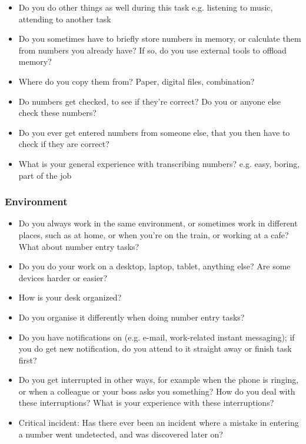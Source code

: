 \documentclass[11pt,oneside]{report}
\begin{document}
\begin{table}
\begin{itemize}
\item Do you do other things as well during this task
e.g. listening to music, attending to another task
\item Do you sometimes have to briefly store numbers in memory, or calculate them from numbers you already have?
If so, do you use external tools to offload memory?
\item Where do you copy them from? Paper, digital files, combination?
\item Do numbers get checked, to see if they're correct? Do you or anyone else check these numbers?
\item Do you ever get entered numbers from someone else, that you then have to check if they are correct?
\item What is your general experience with transcribing numbers?
e.g. easy, boring, part of the job
\end{itemize}
\subsubsection{Environment}
\begin{itemize}
\item Do you always work in the same environment, or sometimes work in different places, such as at home, or when you're on the train, or working at a cafe? What about number entry tasks?
\item Do you do your work on a desktop, laptop, tablet, anything else? Are some devices harder or easier?
\item How is your desk organized?
\item Do you organise it differently when doing number entry tasks?
\item Do you have notifications on (e.g. e-mail, work-related instant messaging); if you do get new notification, do you attend to it straight away or finish task first?
\item Do you get interrupted in other ways, for example when the phone is ringing, or when a colleague or your boss asks you something? How do you deal with these interruptions? What is your experience with these interruptions?
\item Critical incident: Has there ever been an incident where a mistake in entering a number went undetected, and was discovered later on?
\end{itemize}

\end{table}
\end{document}
